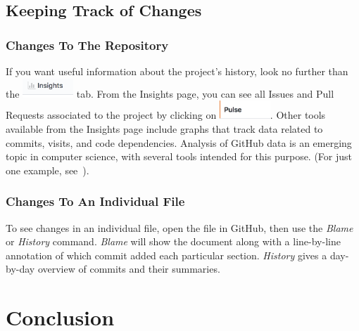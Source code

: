 \documentclass[11pt]{article}
\begin{document}
\subsection{Keeping Track of Changes}

\subsubsection{Changes To The Repository} 

If you want useful information about the project's history, look no further than the \includegraphics[width=0.75in]{Insights} tab. From the Insights page, you can see all Issues and Pull Requests associated to the project by clicking on  \includegraphics[width=0.75in]{Pulse}. Other tools available from the Insights page include graphs that track data related to commits, visits, and code dependencies. Analysis of GitHub data is an emerging topic in computer science, with several tools intended for this purpose. (For just one example, see~\cite{github-gender-study}). 

\subsubsection{Changes To An Individual File}

To see changes in an individual file, open the file in GitHub, then use the \textit{Blame} or \textit{History} command. \textit{Blame} will show the document along with a line-by-line annotation of which commit added each particular section. \textit{History} gives a day-by-day overview of commits and their summaries. 

\section{Conclusion}



\end{document}

